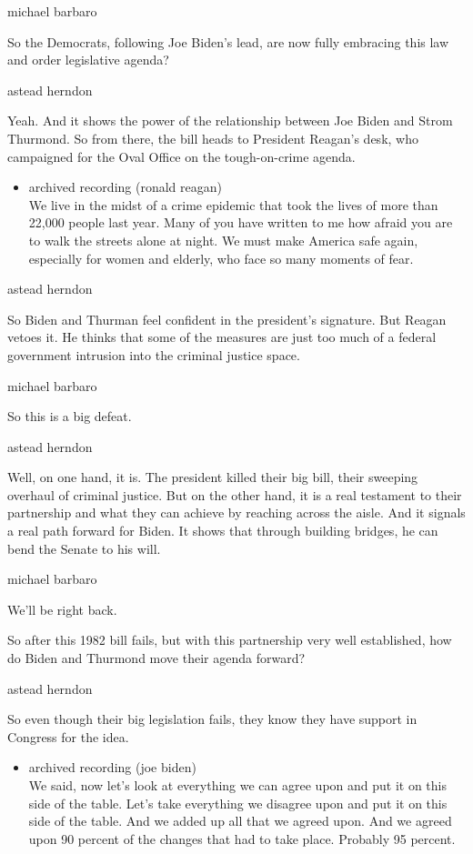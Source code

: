 michael barbaro

So the Democrats, following Joe Biden's lead, are now fully embracing
this law and order legislative agenda?

astead herndon

Yeah. And it shows the power of the relationship between Joe Biden and
Strom Thurmond. So from there, the bill heads to President Reagan's
desk, who campaigned for the Oval Office on the tough-on-crime agenda.

\begin{itemize}
\tightlist
\item
  archived recording (ronald reagan)\\
  We live in the midst of a crime epidemic that took the lives of more
  than 22,000 people last year. Many of you have written to me how
  afraid you are to walk the streets alone at night. We must make
  America safe again, especially for women and elderly, who face so many
  moments of fear.
\end{itemize}

astead herndon

So Biden and Thurman feel confident in the president's signature. But
Reagan vetoes it. He thinks that some of the measures are just too much
of a federal government intrusion into the criminal justice space.

michael barbaro

So this is a big defeat.

astead herndon

Well, on one hand, it is. The president killed their big bill, their
sweeping overhaul of criminal justice. But on the other hand, it is a
real testament to their partnership and what they can achieve by
reaching across the aisle. And it signals a real path forward for Biden.
It shows that through building bridges, he can bend the Senate to his
will.

michael barbaro

We'll be right back.

So after this 1982 bill fails, but with this partnership very well
established, how do Biden and Thurmond move their agenda forward?

astead herndon

So even though their big legislation fails, they know they have support
in Congress for the idea.

\begin{itemize}
\tightlist
\item
  archived recording (joe biden)\\
  We said, now let's look at everything we can agree upon and put it on
  this side of the table. Let's take everything we disagree upon and put
  it on this side of the table. And we added up all that we agreed upon.
  And we agreed upon 90 percent of the changes that had to take place.
  Probably 95 percent.
\end{itemize}

